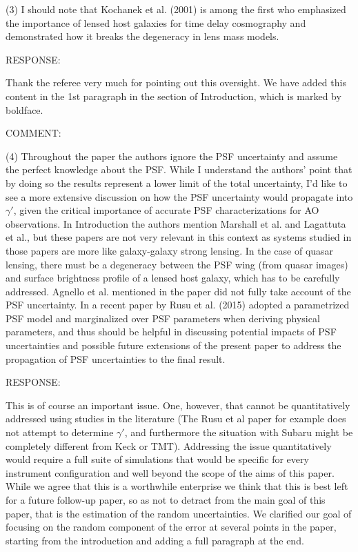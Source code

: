 \documentclass[a4paper,11pt]{article}
\begin{document}
(3) I should note that Kochanek et al. (2001) is among the first 
who emphasized the importance of lensed host galaxies 
for time delay cosmography and demonstrated 
how it breaks the degeneracy in lens mass models.


RESPONSE:

Thank the referee very much for pointing out this oversight. 
We have added this content in the 1st paragraph 
in the section of Introduction, which is marked by boldface.

COMMENT:

(4) Throughout the paper the authors ignore the PSF uncertainty and
assume the perfect knowledge about the PSF. While I understand the
authors' point that by doing so the results represent a lower limit of
the total uncertainty, I'd like to see a more extensive discussion on
how the PSF uncertainty would propagate into $\gamma'$, given the
critical importance of accurate PSF characterizations for AO
observations. In Introduction the authors mention Marshall et al. and
Lagattuta et al., but these papers are not very relevant in this
context as systems studied in those papers are more like galaxy-galaxy
strong lensing. In the case of quasar lensing, there must be a
degeneracy between the PSF wing (from quasar images) and surface
brightness profile of a lensed host galaxy, which has to be carefully
addressed. Agnello et al. mentioned in the paper did not fully take
account of the PSF uncertainty. In a recent paper by Rusu et
al. (2015) adopted a parametrized PSF model and marginalized over PSF
parameters when deriving physical parameters, and thus should be
helpful in discussing potential impacts of PSF uncertainties and
possible future extensions of the present paper to address the
propagation of PSF uncertainties to the final result.

RESPONSE:

This is of course an important issue. One, however, that cannot be
quantitatively addressed using studies in the literature (The Rusu et
al paper for example does not attempt to determine $\gamma'$, and
furthermore the situation with Subaru might be completely different
from Keck or TMT). Addressing the issue quantitatively would require a
full suite of simulations that would be specific for every instrument
configuration and well beyond the scope of the aims of this
paper. While we agree that this is a worthwhile enterprise we think
that this is best left for a future follow-up paper, so as not to
detract from the main goal of this paper, that is the estimation of
the random uncertainties. We clarified our goal of focusing on the
random component of the error at several points in the paper, starting
from the introduction and adding a full paragraph at the end.
\end{document}
